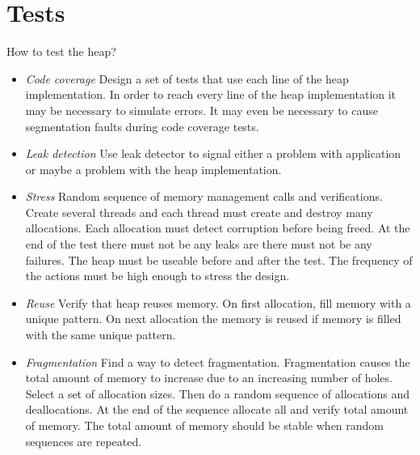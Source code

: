 \section{Tests}

How to test the heap?

\begin{itemize}

\item \emph{Code coverage}  Design a set of tests that use each line of the
heap implementation.  In order to reach every line of the heap implementation
it may be necessary to simulate errors.  It may even be necessary to cause
segmentation faults during code coverage tests.

\item \emph{Leak detection}  Use leak detector to signal either a problem with
application or maybe a problem with the heap implementation.

\item \emph{Stress}  Random sequence of memory management calls and
verifications.  Create several threads and each thread must create and destroy
many allocations.  Each allocation must detect corruption before being freed.
At the end of the test there must not be any leaks are there must not be any
failures.  The heap must be useable before and after the test.  The frequency
of the actions must be high enough to stress the design.

\item \emph{Reuse}  Verify that heap reuses memory.  On first allocation, fill
memory with a unique pattern.  On next allocation the memory is reused if
memory is filled with the same unique pattern.

\item \emph{Fragmentation}  Find a way to detect fragmentation.  Fragmentation
causes the total amount of memory to increase due to an increasing number of
holes.  Select a set of allocation sizes.  Then do a random sequence of
allocations and deallocations.  At the end of the sequence allocate all and
verify total amount of memory.  The total amount of memory should be stable
when random sequences are repeated.

\end{itemize}



